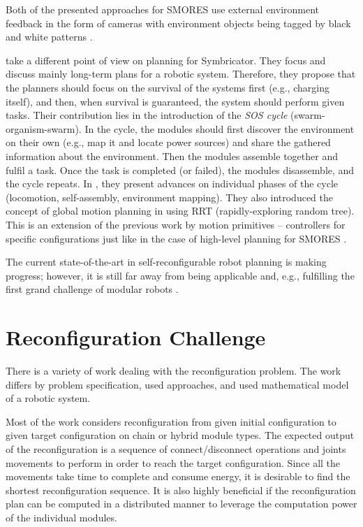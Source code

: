 Both of the presented approaches for SMORES use external environment feedback
in the form of cameras with environment objects being tagged by black and white
patterns \cite{DBLP:journals/scirobotics/JingTYKC18}.

\textcite{DBLP:conf/syscon/LeviMRKVSLC14} take a different point of view on
planning for Symbricator. They focus and discuss mainly long-term plans for a
robotic system. Therefore, they propose that the planners should focus on
the survival of the systems first (e.g., charging itself), and then, when
survival is guaranteed, the system should perform given tasks. Their
contribution lies in the introduction of the \emph{SOS cycle}
(swarm-organism-swarm). In the cycle, the modules should first discover the
environment on their own (e.g., map it and locate power sources) and
share the gathered information about the environment. Then the modules assemble
together and fulfil a task. Once the task is completed (or failed), the modules
disassemble, and the cycle repeats. In \cite{DBLP:conf/syscon/LeviMRKVSLC14},
they present advances on individual phases of the cycle (locomotion,
self-assembly, environment mapping). They also introduced the concept of global
motion planning in \cite{DBLP:conf/icra/VonasekSKP13} using RRT
(rapidly-exploring random tree). This is an extension of the previous work
\cite{DBLP:conf/taros/VonasekKP12} by motion primitives -- controllers for
specific configurations just like in the case of high-level planning for SMORES
\cite{DBLP:journals/arobots/JingTYK18}.

The current state-of-the-art in self-reconfigurable robot planning is making
progress; however, it is still far away from being applicable and, e.g.,
fulfilling the first grand challenge of modular robots
\cite{DBLP:journals/corr/abs-1108-5543}.

\section{Reconfiguration Challenge}\label{sec:chal-reconfig}

There is a variety of work dealing with the reconfiguration problem. The work
differs by problem specification, used approaches, and used mathematical model
of a robotic system.

Most of the work considers reconfiguration from given initial configuration to
given target configuration on chain or hybrid module types. The expected output
of the reconfiguration is a sequence of connect/disconnect operations and joints
movements to perform in order to reach the target configuration. Since all the
movements take time to complete and consume energy, it is desirable to find the
shortest reconfiguration sequence. It is also highly beneficial if the
reconfiguration plan can be computed in a distributed manner to leverage the
computation power of the individual modules.

